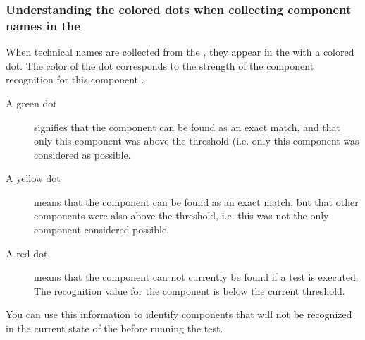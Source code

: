
\subsubsection{Understanding the colored dots when collecting component names in the \gdomeditor{}}
\label{TasksOMStateColor}

When technical names are collected from the \gdaut{}, they appear in the \gdomeditor{} with a colored dot. The color of the dot corresponds to the strength of the component recognition for this component . 

\begin{description}
\item [A green dot]{signifies that the component can be found as an exact match, and that only this component was above the threshold  (i.e. only this component was considered as possible.}
\item [A yellow dot]{means that the component can be found as an exact match, but that other components were also above the threshold, i.e. this was not the only component considered possible.}
\item [A red dot]{means that the component can not currently be found if a test is executed. The recognition value for the component is below the current threshold.}
\end{description}

You can use this information to identify components that will not be recognized in the current state of the \gdaut{} before running the test. 

